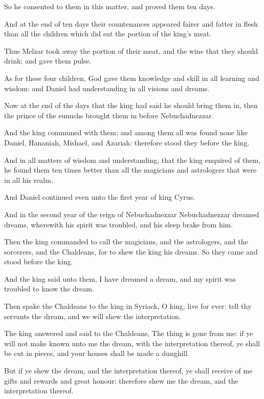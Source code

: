 \Verse So he consented to them in this matter, and proved them ten days.

\Verse And at the end of ten days their countenances appeared fairer and fatter in flesh than all the children which did eat the portion of the king's meat.

\Verse Thus Melzar took away the portion of their meat, and the wine that they should drink; and gave them pulse.

\Verse As for these four children, God gave them knowledge and skill in all learning and wisdom: and Daniel had understanding in all visions and dreams.

\Verse Now at the end of the days that the king had said he should bring them in, then the prince of the eunuchs brought them in before Nebuchadnezzar.

\Verse And the king communed with them; and among them all was found none like Daniel, Hananiah, Mishael, and Azariah: therefore stood they before the king.

\Verse And in all matters of wisdom and understanding, that the king enquired of them, he found them ten times better than all the magicians and astrologers that were in all his realm.

\Verse And Daniel continued even unto the first year of king Cyrus.


\Chapter
\Verse And in the second year of the reign of Nebuchadnezzar Nebuchadnezzar dreamed dreams, wherewith his spirit was troubled, and his sleep brake from him.

\Verse Then the king commanded to call the magicians, and the astrologers, and the sorcerers, and the Chaldeans, for to shew the king his dreams. So they came and stood before the king.

\Verse And the king said unto them, I have dreamed a dream, and my spirit was troubled to know the dream.

\Verse Then spake the Chaldeans to the king in Syriack, O king, live for ever: tell thy servants the dream, and we will shew the interpretation.

\Verse The king answered and said to the Chaldeans, The thing is gone from me: if ye will not make known unto me the dream, with the interpretation thereof, ye shall be cut in pieces, and your houses shall be made a dunghill.

\Verse But if ye shew the dream, and the interpretation thereof, ye shall receive of me gifts and rewards and great honour: therefore shew me the dream, and the interpretation thereof.

